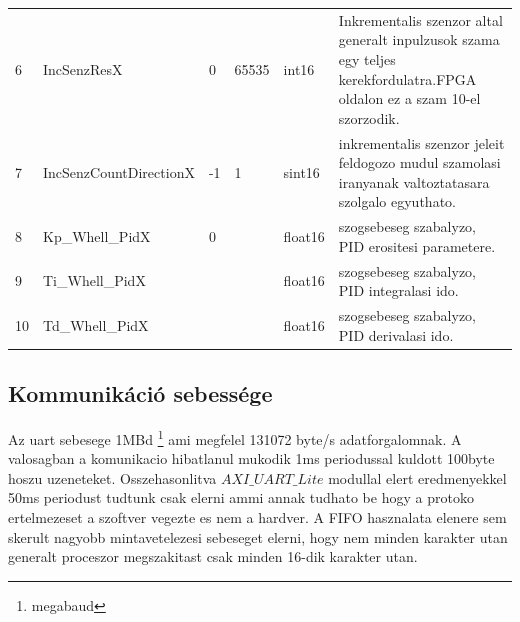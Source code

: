 \begin{table}[H]
\begin{tabular}{lllllp{6cm}}
6                   & IncSenzResX                                                                        & 0           & 65535         & int16                  &  Inkrementalis szenzor altal generalt inpulzusok szama egy teljes kerekfordulatra.FPGA oldalon ez a szam 10-el szorzodik.                     \\
7                   & IncSenzCountDirectionX                                                             & -1          & 1             & sint16                 &  inkrementalis szenzor jeleit feldogozo mudul szamolasi iranyanak valtoztatasara szolgalo egyuthato.                                          \\
8                   & Kp\_Whell\_PidX                                                                    & 0           &               & float16                &  szogsebeseg szabalyzo, PID erositesi parametere.                                                                                             \\
9                   & Ti\_Whell\_PidX                                                                    &             &               & float16                &  szogsebeseg szabalyzo, PID integralasi ido.                                                                                                  \\
10                  & Td\_Whell\_PidX                                                                    &             &               & float16                &  szogsebeseg szabalyzo, PID derivalasi ido.                                                                                                   
\end{tabular}
\end{table}






\subsection{Kommunikáció sebessége}

Az uart sebesege 1MBd \footnote{megabaud} ami megfelel 131072 byte/s adatforgalomnak. A valosagban a komunikacio hibatlanul mukodik 1ms periodussal kuldott 100byte hoszu uzeneteket. Osszehasonlitva $AXI\_UART\_Lite$ \cite{AXIuartLite} modullal elert eredmenyekkel 50ms periodust tudtunk csak elerni ammi annak tudhato be hogy a protoko ertelmezeset a szoftver vegezte es nem a hardver. A FIFO hasznalata elenere sem skerult nagyobb mintavetelezesi sebeseget elerni, hogy nem minden karakter utan generalt proceszor megszakitast csak minden 16-dik karakter utan.

